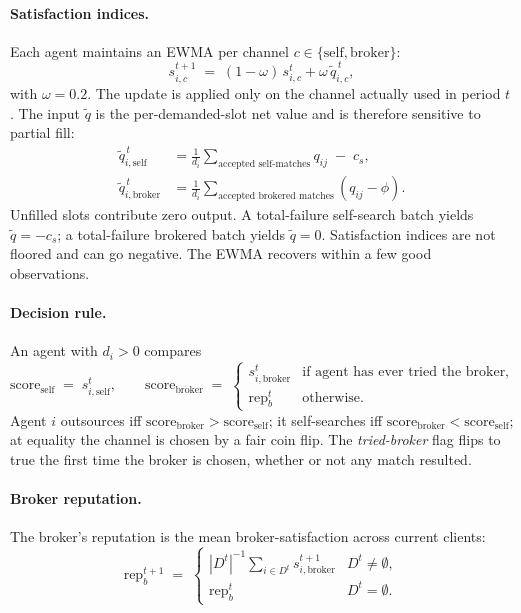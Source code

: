 \documentclass[11pt]{article}
\newcommand{\rep}{\mathrm{rep}}
\newcommand{\self}{\mathrm{self}}
\newcommand{\brk}{\mathrm{broker}}
\begin{document}
\paragraph{Satisfaction indices.} Each agent maintains an EWMA per channel $c\in\{\self,\brk\}$:
\begin{equation}
s_{i,c}^{t+1} \;=\; (1-\omega)\,s_{i,c}^{t} + \omega\,\tilde q_{i,c}^{\,t},
\label{eq:ewma}
\end{equation}
with $\omega=0.2$. The update is applied only on the channel actually used in period $t$. The input $\tilde q$ is the per-demanded-slot net value and is therefore sensitive to partial fill:
\begin{align}
\tilde q_{i,\self}^{\,t} &= \frac{1}{d_i}\!\!\sum_{\text{accepted self-matches}}\!\!q_{ij} \;-\; c_s,\label{eq:qtilde-self}\\
\tilde q_{i,\brk}^{\,t}  &= \frac{1}{d_i}\!\!\sum_{\text{accepted brokered matches}}\!\!(q_{ij} - \phi).\label{eq:qtilde-brk}
\end{align}
Unfilled slots contribute zero output. A total-failure self-search batch yields $\tilde q = -c_s$; a total-failure brokered batch yields $\tilde q = 0$. Satisfaction indices are not floored and can go negative. The EWMA recovers within a few good observations.

\paragraph{Decision rule.} An agent with $d_i>0$ compares
\begin{equation}
\text{score}_\self \;=\; s_{i,\self}^t,\qquad
\text{score}_\brk \;=\;
\begin{cases}
s_{i,\brk}^t & \text{if agent has ever tried the broker,}\\
\rep_b^t & \text{otherwise.}
\end{cases}
\label{eq:scores}
\end{equation}
Agent $i$ outsources iff $\text{score}_\brk > \text{score}_\self$; it self-searches iff $\text{score}_\brk < \text{score}_\self$; at equality the channel is chosen by a fair coin flip. The \emph{tried-broker} flag flips to true the first time the broker is chosen, whether or not any match resulted.

\paragraph{Broker reputation.} The broker's reputation is the mean broker-satisfaction across current clients:
\begin{equation}
\rep_b^{t+1} \;=\;
\begin{cases}
|D^t|^{-1}\sum_{i\in D^t} s_{i,\brk}^{t+1} & D^t\neq\emptyset,\\
\rep_b^{t} & D^t=\emptyset.
\end{cases}
\label{eq:rep}
\end{equation}
\end{document}
